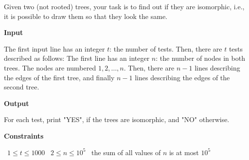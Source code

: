 Given two (not rooted) trees, your task is to find out if they are isomorphic, i.e., it is possible to draw them so that they look the same.

\vspace{0.3cm}\noindent\textbf{Input}

The first input line has an integer $t$: the number of tests. Then, there are $t$ tests described as follows:
The first line has an integer $n$: the number of nodes in both trees. The nodes are numbered $1,2,\dots,n$.
Then, there are $n-1$ lines describing the edges of the first tree, and finally $n-1$ lines describing the edges of the second tree.

\vspace{0.3cm}\noindent\textbf{Output}

For each test, print "YES", if the trees are isomorphic, and "NO" otherwise.

\vspace{0.3cm}\noindent\textbf{Constraints}

\textbullet\ $1 \le t \le 1000$
\textbullet\ $2 \le n \le 10^5$
\textbullet\ the sum of all values of $n$ is at most $10^5$
